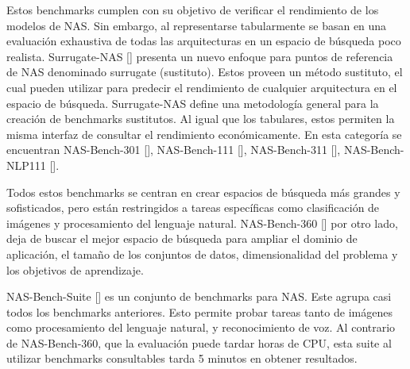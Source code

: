 Estos benchmarks cumplen con su objetivo de verificar el rendimiento de los modelos de NAS. Sin embargo, al representarse tabularmente se basan en una 
evaluación exhaustiva de todas las arquitecturas en un espacio de búsqueda poco realista. Surrugate-NAS [\cite{66}] presenta un nuevo enfoque para puntos de 
referencia de NAS denominado surrugate (sustituto). Estos proveen un método sustituto, el cual pueden utilizar para predecir el rendimiento de cualquier arquitectura 
en el espacio de búsqueda. Surrugate-NAS define una metodología general para la creación de benchmarks sustitutos. Al igual que los tabulares, estos permiten la 
misma interfaz de consultar el rendimiento económicamente. En esta categoría se encuentran NAS-Bench-301 [\cite{57}], NAS-Bench-111 [\cite{58}], 
NAS-Bench-311 [\cite{58}], NAS-Bench-NLP111 [\cite{58}].

Todos estos benchmarks se centran en crear espacios de búsqueda más grandes y sofisticados, pero están restringidos a tareas específicas como clasificación de imágenes 
y procesamiento del lenguaje natural. NAS-Bench-360 [\cite{51}] por otro lado, deja de buscar el mejor espacio de búsqueda para ampliar el dominio de aplicación, el 
tamaño de los conjuntos de datos, dimensionalidad del problema y los objetivos de aprendizaje.

NAS-Bench-Suite [\cite{58}] es un conjunto de benchmarks para NAS. Este agrupa casi todos los benchmarks anteriores. Esto permite probar tareas tanto de 
imágenes como procesamiento del lenguaje natural, y reconocimiento de voz. Al contrario de NAS-Bench-360, que la evaluación puede tardar horas de CPU, esta suite al 
utilizar benchmarks consultables tarda 5 minutos en obtener resultados.




